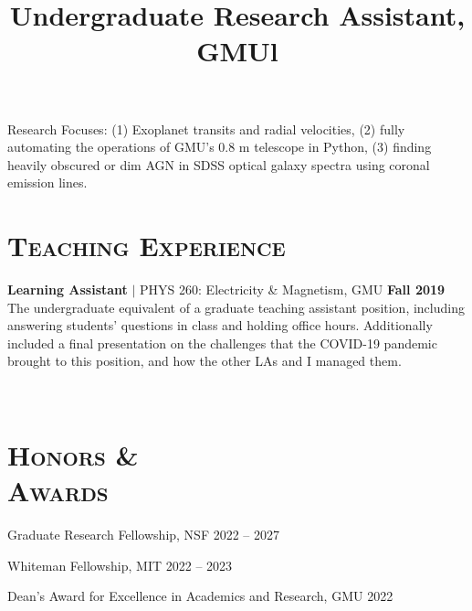\documentclass[marg, centered]{res}
\begin{document}
\begin{resume}
\title{\textbf{Undergraduate Research Assistant}, GMU}
\begin{position}
{\small Research Focuses: (1) Exoplanet transits and radial velocities, (2) fully automating the operations of GMU's 0.8 m telescope in Python, (3) finding heavily obscured or dim AGN in SDSS optical galaxy spectra using coronal emission lines.}
\end{position}

\section{{\scshape \bfseries Teaching Experience}}

{\textbf{Learning Assistant} $|$ PHYS 260: Electricity \& Magnetism, GMU \hfill \textbf{Fall 2019}} \\
{\small The undergraduate equivalent of a graduate teaching assistant position, including answering students' questions in class and holding office hours. Additionally included a final presentation on the challenges that the COVID-19 pandemic brought to this position, and how the other LAs and I managed them.}


\begin{format}
\title{l} \\
\body
\end{format}


\section{{\scshape \bfseries Honors \&\\ Awards}}

{Graduate Research Fellowship, NSF \hfill 2022 -- 2027}
\vspace{-0.4cm}

{Whiteman Fellowship, MIT \hfill 2022 -- 2023}
\vspace{-0.4cm}

{Dean's Award for Excellence in Academics and Research, GMU \hfill 2022}
\vspace{-0.4cm}


\end{resume}
\end{document}
